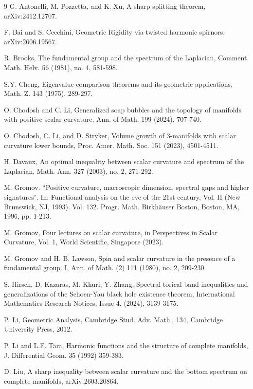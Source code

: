 \documentclass{amsart}
\numberwithin{equation}{section}
\begin{document}
\begin{thebibliography}{9}
 G. Antonelli, M. Pozzetta, and K. Xu, A sharp splitting
theorem, arXiv:2412.12707.

 F. Bai and S. Cecchini, Geometric Rigidity via twisted harmonic spirnors, arXiv:2606.19567.

 R. Brooks, The fundamental group and the spectrum of the Laplacian,
Comment. Math. Helv. 56 (1981), no. 4, 581-598.

 S.Y. Cheng, Eigenvalue comparison theorems and its geometric
applications, Math. Z. 143 (1975), 289-297.


 O. Chodosh and C. Li, Generalized soap bubbles and the topology
of manifolds with positive scalar curvature, Ann. of Math. 199 (2024),
707-740.

 O. Chodosh, C. Li, and D. Stryker, Volume growth of $3$-manifolds 
with scalar curvature lower bounds, Proc. Amer. Math. Soc. 151
(2023), 4501-4511.

 H. Davaux, An optimal inequality between scalar curvature and spectrum of the Laplacian, Math.
Ann. 327 (2003), no. 2, 271-292. 

 M. Gromov. ``Positive curvature, macroscopic dimension, spectral gaps and higher signatures".
In: Functional analysis on the eve of the 21st century, Vol. II (New Brunswick, NJ, 1993).
Vol. 132. Progr. Math. Birkh\"auser Boston, Boston, MA, 1996, pp. 1-213.

 M. Gromov, Four lectures on scalar curvature, in Perspectives in Scalar Curvature, Vol. 1, World
Scientific, Singapore (2023).

 M. Gromov and H. B. Lawson, 
Spin and scalar curvature in the presence of a fundamental group. I,
Ann. of Math. (2) 111 (1980), no. 2, 209-230. 

 S. Hirsch, D. Kazaras, M. Khuri, Y. Zhang, Spectral torical band inequalities and 
generalizations of the Schoen-Yau black hole existence theorem, 
International Mathematics Research Notices,  Issue 4,  (2024),  3139-3175.


 P. Li, Geometric Analysis, Cambridge Stud. Adv. Math., 134,
Cambridge University Press, 2012.


 P. Li and L.F. Tam, Harmonic functions and the structure of
complete manifolds, J. Differential Geom. 35 (1992) 359-383.

 D. Liu, A sharp inequality between scalar curvature and the bottom spectrum on complete manifolds, 	arXiv:2603.20864.




\end{thebibliography}
\end{document}
